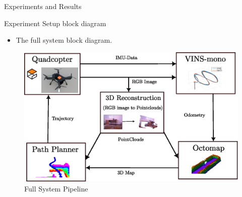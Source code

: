 \documentclass[10pt]{beamer}
\begin{document}
\begin{frame}{Experiments and Results}
    \begin{description}
        \item[Experiment Setup block diagram]
    \end{description}
    \begin{itemize}
        \item The full system block diagram.
    \end{itemize}
    \begin{figure}[!ht]
        \centering
        \includegraphics[scale=0.5]{Visual-Pipeline.eps}
        \caption{Full System Pipeline}
        \label{fig:vis_archi_full}
    \end{figure}
\end{frame}
\end{document}
